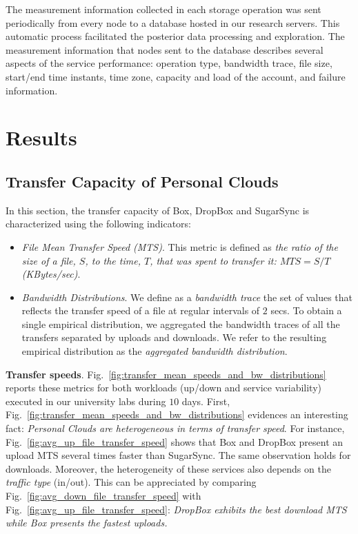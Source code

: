 The measurement information collected in each storage operation
was sent periodically from every node 
to a database hosted in our research servers. This automatic process
facilitated the posterior data processing and exploration. The measurement information
that nodes sent to the database describes several aspects of the service performance:
operation type, bandwidth trace, file size, start/end time instants, 
time zone, capacity and load of the account, and failure information.

\section{Results}

\subsection{Transfer Capacity of Personal Clouds}
In this section, the transfer capacity of Box, DropBox and SugarSync is characterized using the following indicators:
\begin{itemize}
	\item \textit{File Mean Transfer Speed (MTS)}. This metric is defined as \textit{the ratio of
	the size of a file, $S$, to the time, $T$, that was spent to transfer it: $MTS = {S}/{T}$ (KBytes/sec)}. 
	\item \textit{Bandwidth Distributions}. We define as a \textit{bandwidth trace} the set of
	values that reflects the transfer speed of a file at regular intervals of $2$ secs. To
	obtain a single empirical distribution, we aggregated the bandwidth traces of
	all the transfers separated by uploads and downloads. We refer to the resulting empirical
	distribution as the \textit{aggregated bandwidth distribution}.
	 
\end{itemize}

\noindent\textbf{Transfer speeds}. Fig.~\ref{fig:transfer_mean_speeds_and_bw_distributions} 
reports these metrics for both workloads (up/down and service
variability) executed in our university labs during $10$ days.
First, Fig.~\ref{fig:transfer_mean_speeds_and_bw_distributions} 
evidences an interesting fact: \textit{Personal Clouds 
are heterogeneous in terms of transfer speed}.
For instance, Fig.~\ref{fig:avg_up_file_transfer_speed} 
shows that Box and DropBox present an upload MTS 
several times faster than SugarSync. The same observation holds for
downloads. Moreover, the heterogeneity of these services also depends
on the \textit{traffic type} (in/out). This can be appreciated by
comparing Fig.~\ref{fig:avg_down_file_transfer_speed} 
with Fig.~\ref{fig:avg_up_file_transfer_speed}: \textit{DropBox exhibits
the best download MTS while Box presents the fastest 
uploads.}

